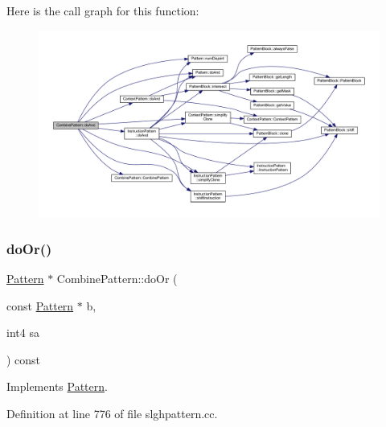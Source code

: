 Here is the call graph for this function\+:
\nopagebreak
\begin{figure}[H]
\begin{center}
\leavevmode
\includegraphics[width=350pt]{class_combine_pattern_aaa5045424b76fd037a192fb4654c7ed8_cgraph}
\end{center}
\end{figure}
\mbox{\label{class_combine_pattern_acc261bd115b31b7f004d5766702e5412}} 
\subsubsection{\texorpdfstring{doOr()}{doOr()}}
{\footnotesize\ttfamily \mbox{\hyperlink{class_pattern}{Pattern}} $\ast$ Combine\+Pattern\+::do\+Or (\begin{DoxyParamCaption}\item[{const \mbox{\hyperlink{class_pattern}{Pattern}} $\ast$}]{b,  }\item[{int4}]{sa }\end{DoxyParamCaption}) const\hspace{0.3cm}{\ttfamily [virtual]}}



Implements \mbox{\hyperlink{class_pattern_a130c23bfea1cb4a1c6e83edf9e2503d3}{Pattern}}.



Definition at line 776 of file slghpattern.\+cc.

